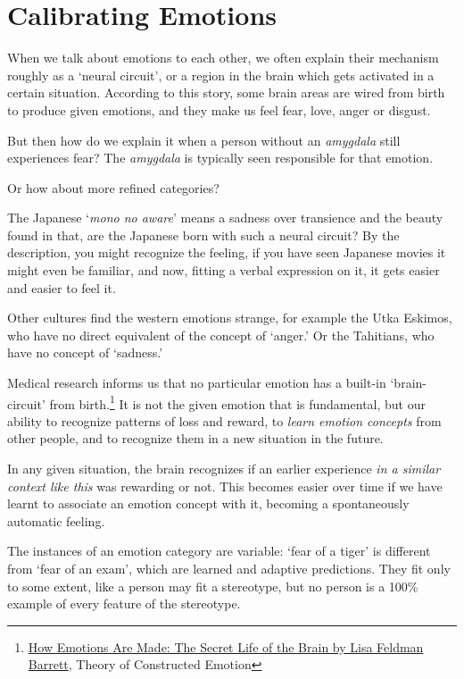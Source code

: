 \section{Calibrating Emotions}


\noindent When we talk about emotions to each other, we often explain
their mechanism roughly as a `neural circuit', or a region in the brain
which gets activated in a certain situation. According to this story,
some brain areas are wired from birth to produce given emotions, and
they make us feel fear, love, anger or disgust.

But then how do we explain it when a person without an \emph{amygdala}
still experiences fear? The \emph{amygdala} is typically seen
responsible for that emotion.

Or how about more refined categories?

The Japanese `\emph{mono no aware}' means a sadness over transience and
the beauty found in that, are the Japanese born with such a neural
circuit? By the description, you might recognize the feeling, if you
have seen Japanese movies it might even be familiar, and now, fitting a
verbal expression on it, it gets easier and easier to feel it.

Other cultures find the western emotions strange, for example the Utka
Eskimos, who have no direct equivalent of the concept of `anger.' Or the
Tahitians, who have no concept of `sadness.'

Medical research informs us that no particular emotion has a built-in
`brain-circuit' from birth.\footnote{\href{https://www.goodreads.com/book/show/23719305-how-emotions-are-made}{How
  Emotions Are Made: The Secret Life of the Brain by Lisa Feldman
  Barrett}, Theory of Constructed Emotion} It is not the given emotion
that is fundamental, but our ability to recognize patterns of loss and
reward, to \emph{learn emotion concepts} from other people, and to
recognize them in a new situation in the future.

In any given situation, the brain recognizes if an earlier experience
\emph{in a similar context like this} was rewarding or not. This becomes
easier over time if we have learnt to associate an emotion concept with
it, becoming a spontaneously automatic feeling.

The instances of an emotion category are variable: `fear of a tiger' is
different from `fear of an exam', which are learned and adaptive
predictions. They fit only to some extent, like a person may fit a
stereotype, but no person is a 100\% example of every feature of the
stereotype.

